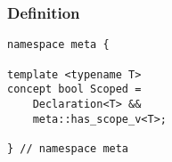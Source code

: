 
\subsubsection{Definition}

\begin{verbatim}
namespace meta {

template <typename T>
concept bool Scoped =
	Declaration<T> &&
	meta::has_scope_v<T>;

} // namespace meta
\end{verbatim}
